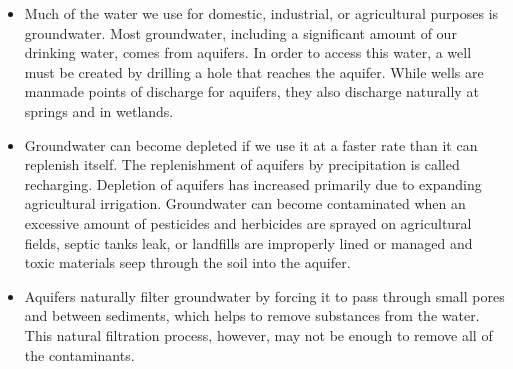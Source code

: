 \begin{itemize}
\item Much of the water we use for domestic, industrial, or agricultural purposes is groundwater. Most groundwater, including a significant amount of our drinking water, comes from aquifers. In order to access this water, a well must be created by drilling a hole that reaches the aquifer. While wells are manmade points of discharge for aquifers, they also discharge naturally at springs and in wetlands.

\item Groundwater can become depleted if we use it at a faster rate than it can replenish itself. The replenishment of aquifers by precipitation is called recharging. Depletion of aquifers has increased primarily due to expanding agricultural irrigation. Groundwater can become contaminated when an excessive amount of pesticides and herbicides are sprayed on agricultural fields, septic tanks leak, or landfills are improperly lined or managed and toxic materials seep through the soil into the aquifer.

\item Aquifers naturally filter groundwater by forcing it to pass through small pores and between sediments, which helps to remove substances from the water. This natural filtration process, however, may not be enough to remove all of the contaminants.


\end{itemize}
